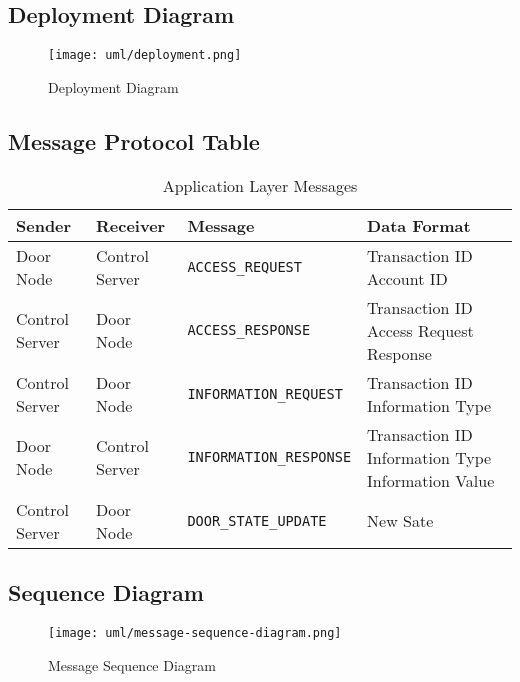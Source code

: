 
\subsection{Deployment Diagram}

\begin{figure}[!htb]
\centering
\texttt{[image: uml/deployment.png]}
\caption{Deployment Diagram}
\label{fig:deployment-diagram}
\end{figure}

\subsection{Message Protocol Table}

\begin{table*}[htb]
\begin{tabular}{ l | l | l | p{4.5cm} }
\toprule
Sender & Receiver & Message & Data Format\\
\midrule
Door Node & Control Server & \verb|ACCESS_REQUEST| &
Transaction ID \newline Account ID\\
\hline
Control Server & Door Node & \verb|ACCESS_RESPONSE| &
Transaction ID \newline Access Request Response\\
\hline
Control Server & Door Node & \verb|INFORMATION_REQUEST| &
Transaction ID \newline Information Type\\
\hline
Door Node & Control Server & \verb|INFORMATION_RESPONSE| &
Transaction ID \newline Information Type \newline Information Value\\
\hline
Control Server & Door Node & \verb|DOOR_STATE_UPDATE| & New Sate\\
\bottomrule
\end{tabular}
\caption{Application Layer Messages}
\label{tab:app-layer-messages}
\end{table*}

\subsection{Sequence Diagram}

\begin{figure}[!htb]
\centering
\texttt{[image: uml/message-sequence-diagram.png]}
\caption{Message Sequence Diagram}
\label{fig:message-sequence-diagram}
\end{figure}
